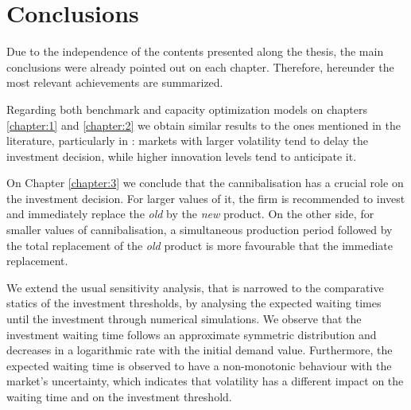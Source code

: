 
\chapter{Conclusions}
\label{chapter:conc}

Due to the independence of the contents presented along the thesis, the main conclusions were already pointed out on each chapter. Therefore, hereunder the most relevant achievements are summarized.

Regarding both benchmark and capacity optimization models on chapters \ref{chapter:1} and \ref{chapter:2} we obtain similar results to the ones mentioned in the literature, particularly in \cite{dixit:book}: markets with larger volatility tend to delay the investment decision, while higher innovation levels tend to anticipate it.

On Chapter \ref{chapter:3} we conclude that the cannibalisation has a crucial role on the investment decision. For larger values of it, the firm is recommended to invest and immediately replace the \textit{old} by the \textit{new} product. On the other side, for smaller values of cannibalisation, a simultaneous production period followed by the total replacement of the \textit{old} product is more favourable that the immediate replacement.
  
We extend the usual sensitivity analysis, that is narrowed to the comparative statics of the investment thresholds, by analysing the expected waiting times until the investment through numerical simulations. We observe that the investment waiting time follows an approximate symmetric distribution and decreases in a logarithmic rate with the initial demand value. Furthermore, the expected waiting time is observed to have a non-monotonic behaviour with the market's uncertainty, which indicates that volatility has a different impact on the waiting time and on the investment threshold.

